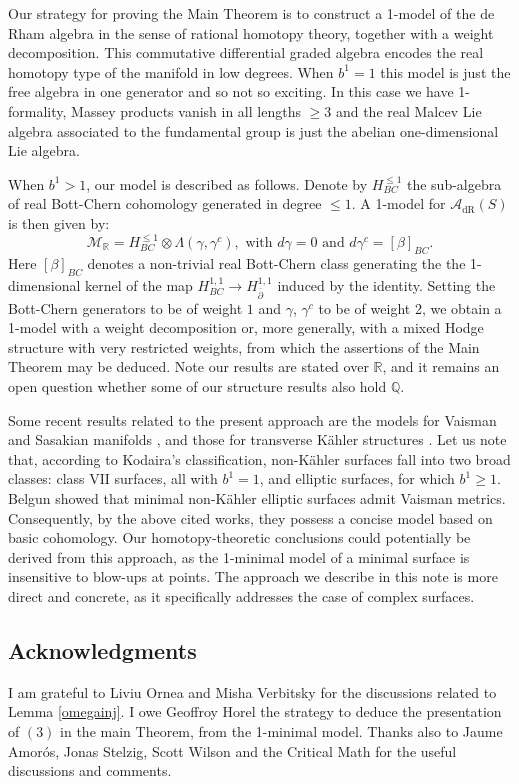 \documentclass[a4paper]{amsart}
\theoremstyle{definition}
\newcommand{\QQ}{\mathbb{Q}}
\newcommand{\RR}{\mathbb{R}}
\newcommand{\Aa}{\mathcal{A}}
\newcommand{\Mm}{\mathcal{M}}
\newcommand{\delb}{{\overline\partial}}
\newcommand{\dR}{\mathrm{dR}}
\begin{document}
Our strategy for proving the Main Theorem is to construct a 1-model of the de Rham algebra in the sense of rational homotopy theory, together with a weight decomposition. This commutative differential graded algebra encodes the real homotopy type of the manifold in low degrees. When $b^1=1$ this model is just the free algebra in one generator and so not so exciting. In this case we have 1-formality, Massey products vanish in all lengths $\geq 3$ and the real Malcev Lie algebra associated to the fundamental group is just the abelian one-dimensional Lie algebra.

When $b^1>1$, our model is described as follows.
Denote by $H_{BC}^{\leq 1}$ the sub-algebra of real Bott-Chern cohomology generated in degree $\leq 1$.
A 1-model for $\Aa_{\dR}(S)$ is then given by:
\[\Mm_\RR=H_{BC}^{\leq 1}\otimes\Lambda(\gamma,\gamma^c),\text{ with }d\gamma=0\text{ and }d\gamma^c=[\beta]_{BC}.\]
Here $[\beta]_{BC}$ denotes a non-trivial real Bott-Chern class generating the
the 1-dimensional kernel of the map $H^{1,1}_{BC}\to H^{1,1}_\delb$ induced by the identity.
Setting the Bott-Chern generators to be of weight $1$ and $\gamma$, $\gamma^c$ to be of weight 2, we obtain
a 1-model with a weight decomposition or, more generally, with a mixed Hodge structure with very restricted weights, from which the assertions of the Main Theorem may be deduced. Note our results are stated over $\RR$, and it remains an open question whether some of our structure results also hold $\QQ$.

Some recent results related to the present approach are the models for Vaisman and Sasakian manifolds \cite{Tievsky}, \cite{CaBe} and those for transverse Kähler structures \cite{Transverse}.
Let us note that,
according to Kodaira's classification, non-Kähler surfaces fall into two broad classes: class \( \mathrm{VII} \) surfaces, all with \( b^1 = 1 \), and elliptic surfaces, for which \( b^1 \geq 1 \).
Belgun \cite{Belgun} showed that minimal non-Kähler elliptic surfaces admit Vaisman metrics. Consequently, by the above cited works, they possess a concise model based on basic cohomology. Our homotopy-theoretic conclusions could potentially be derived from this approach, as the 1-minimal model of a minimal surface is insensitive to blow-ups at points. The approach we describe in this note is more direct and concrete, as it specifically addresses the case of complex surfaces.


\subsection*{Acknowledgments} I am grateful to Liviu Ornea and Misha Verbitsky for the discussions related to Lemma \ref{omegainj}.
I owe Geoffroy Horel the strategy to deduce the presentation of $(3)$ in the main Theorem, from the 1-minimal model.
Thanks also to Jaume Amorós, Jonas Stelzig, Scott Wilson and the Critical Math for the useful discussions and comments.
\end{document}

